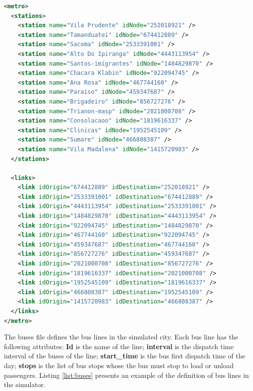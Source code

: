 \renewcommand{\thelstlisting}{\arabic{lstlisting}}
\lstset{language=XML}
\begin{lstlisting}[language=xml, caption=File with the definition of the city subway graph, label=list:subway, upquote=true]
<metro>
  <stations>
    <station name="Vila Prudente" idNode="252018921" />
    <station name="Tamanduatei" idNode="674412889" />
    <station name="Sacoma" idNode="2533391001" />
    <station name="Alto Do Ipiranga" idNode="4443113954" />
    <station name="Santos-imigrantes" idNode="1484829870" />
    <station name="Chacara Klabin" idNode="922094745" />
    <station name="Ana Rosa" idNode="467744160" />
    <station name="Paraiso" idNode="459347687" />
    <station name="Brigadeiro" idNode="856727276" />
    <station name="Trianon-masp" idNode="2021000708" />
    <station name="Consolacaoo" idNode="1819616337" />
    <station name="Clinicas" idNode="1952545109" />
    <station name="Sumare" idNode="466808387" />
    <station name="Vila Madalena" idNode="1415720983" />
  </stations>

  <links>
    <link idOrigin="674412889" idDestination="252018921" />
    <link idOrigin="2533391001" idDestination="674412889" />
    <link idOrigin="4443113954" idDestination="2533391001" />
    <link idOrigin="1484829870" idDestination="4443113954" />
    <link idOrigin="922094745" idDestination="1484829870" />
    <link idOrigin="467744160" idDestination="922094745" />
    <link idOrigin="459347687" idDestination="467744160" />
    <link idOrigin="856727276" idDestination="459347687" />
    <link idOrigin="2021000708" idDestination="856727276" />
    <link idOrigin="1819616337" idDestination="2021000708" />
    <link idOrigin="1952545109" idDestination="1819616337" />
    <link idOrigin="466808387" idDestination="1952545109" />
    <link idOrigin="1415720983" idDestination="466808387" />
  </links>
</metro>
\end{lstlisting}

The buses file defines the bus lines in the simulated city. Each bus line has the following attributes: \textbf{Id} is the name of the line; \textbf{interval} is the dispatch time interval of the buses of the line; \textbf{start\_time} is the bus first dispatch time of the day; \textbf{stops} is the list of bus stops whose the bus must stop to load or unload passengers. Listing \ref{list:buses} presents an example of the definition of bus lines in the simulator.

